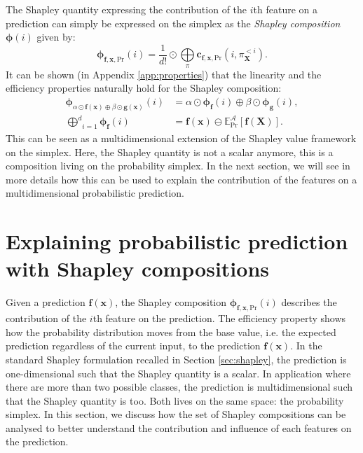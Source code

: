 \documentclass{article}
\theoremstyle{plain}
\theoremstyle{definition}
\theoremstyle{remark}
\begin{document}
The Shapley quantity expressing the contribution of the $i$th feature on a prediction can simply be expressed on the simplex as the \emph{Shapley composition} $\bm{\phi}(i)$ given by:
\begin{equation}
  \bm{\phi}_{\bm{f},\bm{x},\text{Pr}}(i) = \frac{1}{d!} \odot \underset{\pi}{\bigoplus}\bm{c}_{\bm{f},\bm{x},\text{Pr}}(i,\pi^{<i}_{\bm{X}}).
\end{equation}
It can be shown (in Appendix \ref{app:properties}) that the linearity and the efficiency properties naturally hold for the Shapley composition:
\begin{equation}
  \begin{aligned}
    \bm{\phi}_{\alpha \odot \bm{f}(\bm{x}) \oplus \beta \odot \bm{g}(\bm{x})}(i) &= \alpha \odot \bm{\phi}_{\bm{f}}(i) \oplus \beta\odot \bm{\phi}_{\bm{g}}(i),\\
    \underset{i=1}{\overset{d}\bigoplus} \bm{\phi}_{\bm{f}}(i) &= \bm{f}(\bm{x}) \ominus \mathbb{E}^{\mathcal{A}}_{\text{Pr}}[\bm{f}(\bm{X})].
  \end{aligned}
\end{equation}
This can be seen as a multidimensional extension of the Shapley value framework on the simplex. Here, the Shapley quantity is not a scalar anymore, this is a composition living on the probability simplex. In the next section, we will see in more details how this can be used to explain the contribution of the features on a multidimensional probabilistic prediction.

\section{Explaining probabilistic prediction with Shapley compositions}
\label{sec:explain}


Given a prediction $\bm{f}(\bm{x})$, the Shapley composition $\bm{\phi}_{\bm{f},\bm{x},\text{Pr}}(i)$ describes the contribution of the $i$th feature on the prediction. The efficiency property shows how the probability distribution moves from the base value, i.e. the expected prediction regardless of the current input, to the prediction $\bm{f}(\bm{x})$. In the standard Shapley formulation recalled in Section \ref{sec:shapley}, the prediction is one-dimensional such that the Shapley quantity is a scalar. In application where there are more than two possible classes, the prediction is multidimensional such that the Shapley quantity is too. Both lives on the same space: the probability simplex. In this section, we discuss how the set of Shapley compositions can be analysed to better understand the contribution and influence of each features on the prediction.
\end{document}
